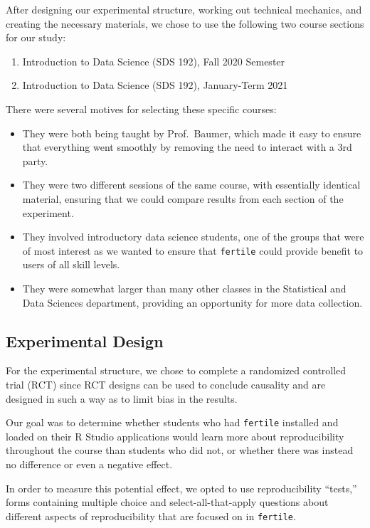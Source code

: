 \documentclass[12pt,twoside]{reedthesis}
\providecommand{\tightlist}{%
  \setlength{\itemsep}{0pt}\setlength{\parskip}{0pt}}
\begin{document}
After designing our experimental structure, working out technical mechanics, and creating the necessary materials, we chose to use the following two course sections for our study:
\begin{enumerate}
\def\labelenumi{\arabic{enumi}.}
\tightlist
\item
  Introduction to Data Science (SDS 192), Fall 2020 Semester
\item
  Introduction to Data Science (SDS 192), January-Term 2021
\end{enumerate}
There were several motives for selecting these specific courses:
\begin{itemize}
\tightlist
\item
  They were both being taught by Prof.~Baumer, which made it easy to ensure that everything went smoothly by removing the need to interact with a 3rd party.
\item
  They were two different sessions of the same course, with essentially identical material, ensuring that we could compare results from each section of the experiment.
\item
  They involved introductory data science students, one of the groups that were of most interest as we wanted to ensure that \texttt{fertile} could provide benefit to users of all skill levels.
\item
  They were somewhat larger than many other classes in the Statistical and Data Sciences department, providing an opportunity for more data collection.
\end{itemize}
\hypertarget{experimental-design}{%
\subsection{Experimental Design}\label{experimental-design}}

For the experimental structure, we chose to complete a randomized controlled trial (RCT) since RCT designs can be used to conclude causality and are designed in such a way as to limit bias in the results.

Our goal was to determine whether students who had \texttt{fertile} installed and loaded on their R Studio applications would learn more about reproducibility throughout the course than students who did not, or whether there was instead no difference or even a negative effect.

In order to measure this potential effect, we opted to use reproducibility ``tests,'' forms containing multiple choice and select-all-that-apply questions about different aspects of reproducibility that are focused on in \texttt{fertile}.
\end{document}
